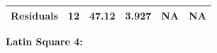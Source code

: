 \documentclass[]{article}
\begin{document}
\begin{longtable}[]{@{}cccccc@{}}
\begin{minipage}[t]{0.19\columnwidth}
\textbf{Residuals}\strut
\end{minipage} & \begin{minipage}[t]{0.06\columnwidth}\centering\strut
12\strut
\end{minipage} & \begin{minipage}[t]{0.10\columnwidth}\centering\strut
47.12\strut
\end{minipage} & \begin{minipage}[t]{0.12\columnwidth}\centering\strut
3.927\strut
\end{minipage} & \begin{minipage}[t]{0.12\columnwidth}\centering\strut
NA\strut
\end{minipage} & \begin{minipage}[t]{0.12\columnwidth}\centering\strut
NA\strut
\end{minipage}\tabularnewline
\bottomrule
\end{longtable}

\textbf{Latin Square 4:}
\end{document}
